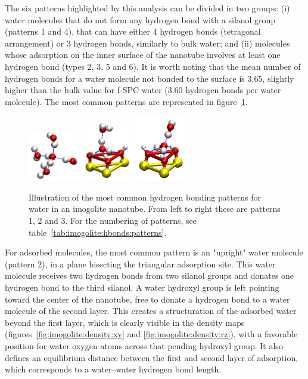 \documentclass[thesis]{subfiles}
\begin{document}
The six patterns highlighted by this analysis can be divided in two groups: (i)
water molecules that do not form any hydrogen bond with a silanol group
(patterns 1 and 4), that can have either 4 hydrogen bonds (tetragonal
arrangement) or 3 hydrogen bonds, similarly to bulk water; and (ii) molecules whose
adsorption on the inner surface of the nanotube involves at least one hydrogen
bond (types 2, 3, 5 and 6). It is worth noting that the mean number of hydrogen
bonds for a water molecule not bonded to the surface is 3.65, slightly higher
than the bulk value for f-SPC water (3.60 hydrogen bonds per water molecule).
The most common patterns are represented in figure~\ref{fig:imogolite:hbonds:patterns}.

\begin{figure}[ht]
    \centering
    \includegraphics[width=0.2\textwidth]{figures/images/imogolite-hbonds-pattern-1}
    \includegraphics[width=0.2\textwidth]{figures/images/imogolite-hbonds-pattern-2}
    \includegraphics[width=0.2\textwidth]{figures/images/imogolite-hbonds-pattern-3}
    \caption{Illustration of the most common hydrogen bonding patterns for water
    in an imogolite nanotube. From left to right these are patterns 1, 2 and 3.
    For the numbering of patterns, see table~\ref{tab:imogolite:hbonds:patterns}.}
    \label{fig:imogolite:hbonds:patterns}
\end{figure}


For adsorbed molecules, the most common pattern is an "upright" water molecule
(pattern 2), in a plane bisecting the triangular adsorption site. This water
molecule receives two hydrogen bonds from two silanol groups and donates one hydrogen
bond to the third silanol. A water hydroxyl group is left pointing toward the
center of the nanotube, free to donate a hydrogen bond to a water molecule of
the second layer. This creates a structuration of the adsorbed water beyond the
first layer, which is clearly visible in the density maps
(figures~\ref{fig:imogolite:density:xy} and \ref{fig:imogolite:density:rz}),
with a favorable position for water oxygen atoms across that pending hydroxyl
group. It also defines an equilibrium distance between the first and second
layer of adsorption, which corresponds to a water--water hydrogen bond length.
\end{document}
